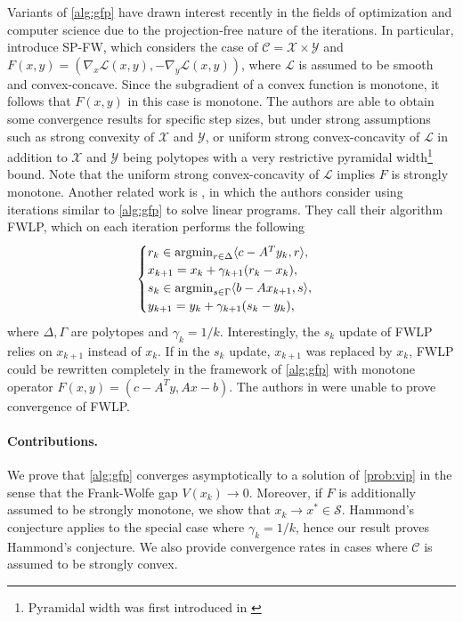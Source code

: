 \documentclass[pdflatex,sn-mathphys-num]{sn-jnl}%
\newcommand\argmin{\mathop{\rm argmin}}
\newcommand\C{\mathcal{C}}
\newcommand\X{\mathcal{X}}
\newcommand\Y{\mathcal{Y}}
\newcommand\mS{\mathcal{S}}
\renewcommand\L{\mathcal{L}}
\theoremstyle{thmstyleone}%
\theoremstyle{thmstyletwo}%
\theoremstyle{thmstylethree}%
\begin{document}
Variants of \eqref{alg:gfp} have drawn interest recently in the fields of optimization and computer science due to the projection-free nature of the iterations.
In particular, \cite{Gidel2017} introduce SP-FW, which considers the case of $\C = \X \times \Y$ and $F(x,y) = \left(\nabla_x \L(x,y), -\nabla_y \L(x,y)\right)$, where $\L$ is assumed to
be smooth and convex-concave. Since the subgradient of a convex function is monotone, it follows that $F(x,y)$ in this case is monotone.
The authors are able to obtain some convergence results for specific step sizes, but under strong assumptions such as strong convexity of $\X$ and $\Y$,
or uniform strong convex-concavity of $\L$ in addition to $\X$ and $\Y$ being polytopes with a very restrictive pyramidal width\footnote{Pyramidal width was first introduced in \cite{LacosteJ2015}} bound. Note that the uniform
strong convex-concavity of $\L$ implies $F$ is strongly monotone. Another related work is \cite{Hough2024}, in which the authors consider using iterations similar
to \eqref{alg:gfp} to solve linear programs. They call their algorithm FWLP, which on each iteration performs the following
\[
  \begin{cases}
  r_{k} \in \argmin_{r \in \Delta} \langle{c - A^Ty_k,r}\rangle,\\
  x_{k+1} = x_k + \gamma_{k+1}(r_k - x_k),\\
  s_{k} \in \argmin_{s \in \Gamma} \langle{b - Ax_{k+1},s}\rangle,\\
  y_{k+1} = y_k + \gamma_{k+1}(s_k - y_k),
  \end{cases}
\]
where $\Delta,\Gamma$ are polytopes and $\gamma_k = 1/k$. Interestingly, the $s_k$ update of FWLP relies on $x_{k+1}$
instead of $x_k$. If in the $s_k$ update, $x_{k+1}$ was replaced by $x_k$, FWLP could be rewritten completely in
the framework of \eqref{alg:gfp} with monotone operator $F(x,y) = (c - A^Ty, Ax - b)$. The authors in \cite{Hough2024} were unable to prove convergence
of FWLP.

\paragraph{Contributions.}
We prove that \eqref{alg:gfp} converges asymptotically to a solution of \eqref{prob:vip} in the sense that the Frank-Wolfe gap $V(x_k) \to 0$. Moreover,
if $F$ is additionally assumed to be strongly monotone, we show that $x_k \to x^* \in \mS$. Hammond's conjecture applies to the special case
where $\gamma_{k} = 1/k$, hence our result proves Hammond's conjecture. We also provide convergence rates in cases
where $\C$ is assumed to be strongly convex.
\end{document}
